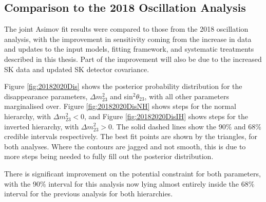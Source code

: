 \subsection{Comparison to the 2018 Oscillation Analysis}\label{sec:joint2018}

The joint Asimov fit results were compared to those from the 2018 oscillation analysis, with the improvement in sensitivity coming from the increase in data and updates to the input models, fitting framework, and systematic treatments described in this thesis. Part of the improvement will also be due to the increased SK data and updated SK detector covariance.

Figure \ref{fig:20182020Dis} shows the posterior probability distribution for the disappearance parameters, $\Delta m^{2}_{23}$ and sin$^{2}\theta_{23}$, with all other parameters marginalised over. Figure \ref{fig:20182020DisNH} shows steps for the normal hierarchy, with $\Delta m^{2}_{23}<0$,  and Figure \ref{fig:20182020DisIH} shows steps for the inverted hierarchy, with $\Delta m^{2}_{23}>0$. The solid dashed lines show the 90$\%$ and 68$\%$ credible intervals respectively. The best fit points are shown by the triangles, for both analyses. Where the contours are jagged and not smooth, this is due to more steps being needed to fully fill out the posterior distribution.

There is significant improvement on the potential constraint for both parameters, with the 90$\%$ interval for this analysis now lying almost entirely inside the 68$\%$ interval for the previous analysis for both hierarchies.

